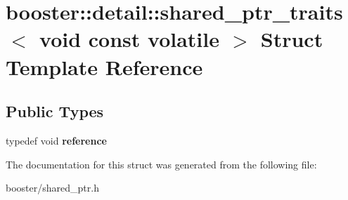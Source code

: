 \section{booster\-:\-:detail\-:\-:shared\-\_\-ptr\-\_\-traits$<$ void const volatile $>$ Struct Template Reference}
\label{structbooster_1_1detail_1_1shared__ptr__traits_3_01void_01const_01volatile_01_4}
\subsection*{Public Types}
\begin{DoxyCompactItemize}
\item 
typedef void {\bfseries reference}\label{structbooster_1_1detail_1_1shared__ptr__traits_3_01void_01const_01volatile_01_4_a604c7d14d2b29328f8ceb2485489b938}

\end{DoxyCompactItemize}


The documentation for this struct was generated from the following file\-:\begin{DoxyCompactItemize}
\item 
booster/shared\-\_\-ptr.\-h\end{DoxyCompactItemize}
